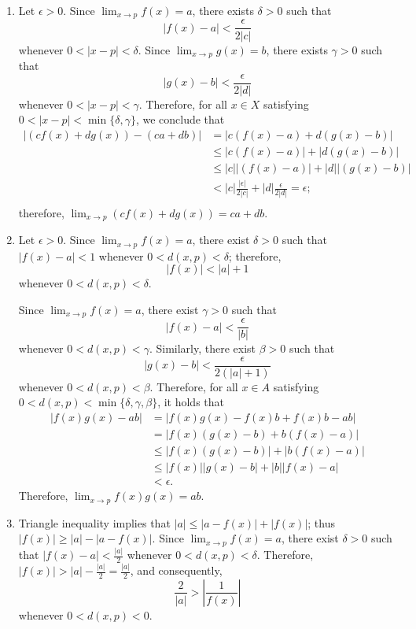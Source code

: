 \begin{dem}{}{}
	\begin{enumerate}
		\item
			Let \(\epsilon > 0\).
			Since \(\lim_{x\to p}f(x) = a\), there exists \(\delta > 0\) such that \[
				|f(x) - a| < \frac{\epsilon}{2|c|}
			\] whenever \(0 < |x - p| < \delta\).
			Since \(\lim_{x\to p}g(x) = b\), there exists \(\gamma > 0\) such that \[
				|g(x) - b| < \frac{\epsilon}{2|d|}
			\] whenever \(0 < |x - p| < \gamma\). Therefore, for all \(x \in X\) satisfying \(0 < |x - p| < \min\{\delta, \gamma\}\), we conclude that
			\begin{align*}
				|(cf(x) + dg(x)) - (ca + db)| &= |c(f(x) - a) + d(g(x) - b)| \\
										   &\leq |c(f(x) - a)| + |d(g(x) - b)| \\
										   &\leq |c||(f(x) - a)| + |d||(g(x) - b)| \\
										   &< |c|\frac{|\epsilon|}{2|c|} + |d|\frac{\epsilon}{2|d|} = \epsilon; \\
			\end{align*}
			therefore, \(\lim_{x\to p} (cf(x) + dg(x)) = ca + db\).
		\item Let \(\epsilon > 0\).
			Since \(\lim_{x\to p} f(x) = a\), there exist \(\delta > 0\) such that \(|f(x) - a| < 1\) whenever \(0 < d(x, p) < \delta\); therefore, \[
				|f(x)| < |a| + 1
			\]
			whenever \(0 < d(x, p) < \delta\).

			Since \(\lim_{x\to p} f(x) = a\), there exist \(\gamma > 0\) such that \[
				|f(x) - a| < \frac{\epsilon}{|b|}
			\] 
			whenever \(0 < d(x, p) < \gamma\).
			Similarly, there exist \(\beta > 0\) such that \[
				|g(x) - b| < \frac{\epsilon}{2 (|a| + 1)}
			\] 
			whenever \(0 < d(x, p) < \beta\).
			Therefore, for all \(x \in A\) satisfying \(0 < d(x, p) < \min\{\delta, \gamma, \beta\}\), it holds that
			\begin{align*}
				|f(x)g(x) - ab| &= |f(x)g(x) - f(x)b + f(x)b - ab| \\
							  &= |f(x)(g(x) - b) + b(f(x) - a)| \\
							  &\leq |f(x)(g(x) - b)| + |b(f(x) - a)| \\
							  &\leq |f(x)||g(x) - b| + |b||f(x) - a| \\
							  &< \epsilon.
			\end{align*}
			Therefore, \(\lim_{x\to p} f(x)g(x) = ab\).
		\item Triangle inequality implies that \(|a| \leq |a - f(x)| + |f(x)|\); thus \(|f(x)| \geq |a| - |a - f(x)|\).
			Since \(\lim_{x\to p} f(x) = a\), there exist \(\delta > 0\) such that \( |f(x) - a| < \frac{|a|}{2} \)  whenever \(0 < d(x, p) < \delta\).
			Therefore, \(|f(x)| > |a| - \frac{|a|}{2} = \frac{|a|}{2}\), and consequently, \[\frac{2}{|a|} > \left|\frac{1}{f(x)}\right|\] whenever \(0 < d(x, p) < 0\).


\end{enumerate}
\end{dem}
